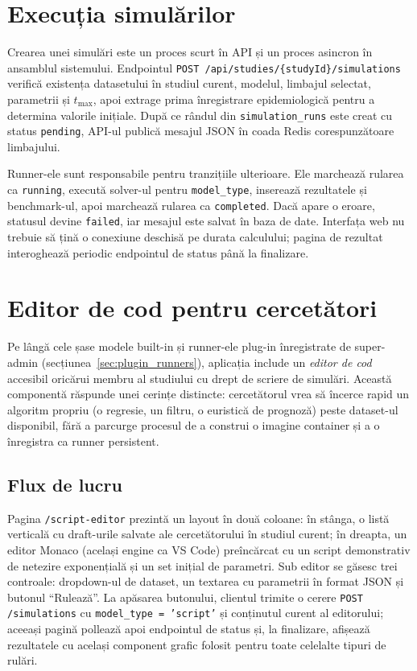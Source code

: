 \section{Execuția simulărilor}
\label{sec:executie_simulari_web}

Crearea unei simulări este un proces scurt în API și un proces asincron în
ansamblul sistemului. Endpointul
\texttt{POST /api/studies/\{studyId\}/simulations} verifică existența
datasetului în studiul curent, modelul, limbajul selectat, parametrii și
$t_{\max}$, apoi extrage prima înregistrare epidemiologică pentru a determina
valorile inițiale. După ce rândul din \texttt{simulation\_runs} este creat cu
status \texttt{pending}, API-ul publică mesajul JSON în coada Redis
corespunzătoare limbajului.

Runner-ele sunt responsabile pentru tranzițiile ulterioare. Ele marchează rularea
ca \texttt{running}, execută solver-ul pentru \texttt{model\_type}, inserează
rezultatele și benchmark-ul, apoi marchează rularea ca \texttt{completed}. Dacă
apare o eroare, statusul devine \texttt{failed}, iar mesajul este salvat în baza de
date. Interfața web nu trebuie să țină o conexiune deschisă pe durata calculului;
pagina de rezultat interoghează periodic endpointul de status până la finalizare.

\section{Editor de cod pentru cercetători}
\label{sec:script_editor}

Pe lângă cele șase modele built-in și runner-ele plug-in înregistrate de
super-admin (secțiunea~\ref{sec:plugin_runners}), aplicația include un
\emph{editor de cod} accesibil oricărui membru al studiului cu drept de scriere
de simulări. Această componentă răspunde unei cerințe distincte: cercetătorul
vrea să încerce rapid un algoritm propriu (o regresie, un filtru, o euristică
de prognoză) peste dataset-ul disponibil, fără a parcurge procesul de a
construi o imagine container și a o înregistra ca runner persistent.

\subsection{Flux de lucru}
\label{subsec:editor_flux}

Pagina \texttt{/script-editor} prezintă un layout în două coloane: în stânga,
o listă verticală cu draft-urile salvate ale cercetătorului în studiul curent;
în dreapta, un editor Monaco (același engine ca VS Code) preîncărcat cu un
script demonstrativ de netezire exponențială și un set inițial de parametri.
Sub editor se găsesc trei controale: dropdown-ul de dataset, un textarea cu
parametrii în format JSON și butonul ``Rulează''. La apăsarea butonului,
clientul trimite o cerere \texttt{POST /simulations} cu \texttt{model\_type =
'script'} și conținutul curent al editorului; aceeași pagină pollează apoi
endpointul de status și, la finalizare, afișează rezultatele cu același
component grafic folosit pentru toate celelalte tipuri de rulări.

